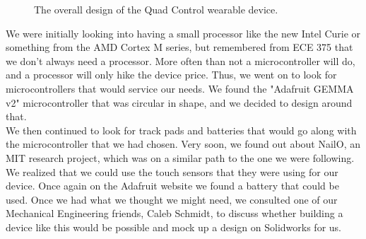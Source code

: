\documentclass[12pt,letterpaper]{article}
\begin{document}
\begin{figure}
\begin{subfigure}{.5\textwidth}
		\label{fig:sub2}
	\end{subfigure}
	\caption{The overall design of the Quad Control wearable device.}
	\label{fig:test}
\end{figure}

\hspace{1cm}We were initially looking into having a small processor like the new Intel Curie or something from the AMD Cortex M series, but remembered from ECE 375 that we don't always need a processor. More often than not a microcontroller will do, and a processor will only hike the device price. Thus, we went on to look for microcontrollers that would service our needs. We found the "Adafruit GEMMA v2" microcontroller that was circular in shape, and we decided to design around that.\\
\hspace{1cm}We then continued to look for track pads and batteries that would go along with the microcontroller that we had chosen. Very soon, we found out about NailO, an MIT research project, which was on a similar path to the one we were following. We realized that we could use the touch sensors that they were using for our device. Once again on the Adafruit website we found a battery that could be used. Once we had what we thought we might need, we consulted one of our Mechanical Engineering friends, Caleb Schmidt, to discuss whether building a device like this would be possible and mock up a design on Solidworks for us.\\
\end{document}
